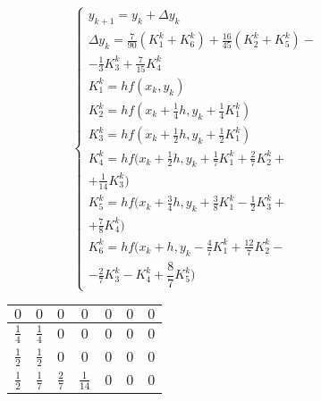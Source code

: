 \begin{figure}
    \begin{minipage}[t]{7.5cm}
        {\small
        \begin{equation*}
            \begin{cases}
                y_{k + 1} = y_k + \Delta y_k\\
                \Delta y_k = \frac{7}{90} (K_1^k + K_6^k) + \frac{16}{45} (K_2^k + K_5^k) -\\
                - \frac{1}{3}K_3^k + \frac{7}{15}K_4^k\\
                K_1^k = hf(x_k, y_k)\\
                K_2^k = hf(x_k + \frac{1}{4}h, y_k + \frac{1}{4}K_1^k)\\
                K_3^k = hf(x_k + \frac{1}{2}h, y_k + \frac{1}{2}K_1^k)\\
                K_4^k = hf(x_k + \frac{1}{2}h, y_k + \frac{1}{7}K_1^k + \frac{2}{7}K_2^k +\\
                + \frac{1}{14}K_3^k)\\
                K_5^k = hf(x_k + \frac{3}{4}h, y_k + \frac{3}{8}K_1^k - \frac{1}{2}K_3^k +\\
                + \frac{7}{8}K_4^k)\\
                K_6^k = hf(x_k + h, y_k - \frac{4}{7}K_1^k + \frac{12}{7}K_2^k -\\
                - \frac{2}{7}K_3^k - K_4^k + \dfrac{8}{7}K_5^k)
            \end{cases}
        \end{equation*}
        }
    \end{minipage}
    \begin{minipage}[t]{7.5cm}
        \begin{table}    
            \begin{tabular}{|c|c|c|c|c|c|c|}
            \hline
            $0$ & $0$ & $0$ & $0$ & $0$ & $0$ & $0$\\
            \hline
            $\frac{1}{4}$ & $\frac{1}{4}$ & $0$ & $0$ & $0$ & $0$ & $0$\\
            \hline
            $\frac{1}{2}$ & $\frac{1}{2}$ & $0$ & $0$ & $0$ & $0$ & $0$\\
            \hline
            $\frac{1}{2}$ & $\frac{1}{7}$ & $\frac{2}{7}$ & $\frac{1}{14}$ & $0$ & $0$ & $0$\\
            \hline

\end{tabular}
\end{table}
\end{minipage}
\end{figure}
